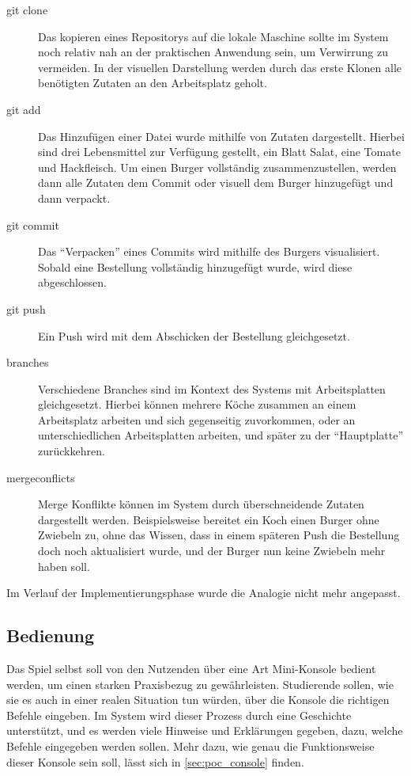 \begin{description}
    \item[git clone] Das kopieren eines Repositorys auf die lokale Maschine sollte im System noch relativ nah an der praktischen Anwendung sein, um Verwirrung zu vermeiden. In der visuellen Darstellung werden durch das erste Klonen alle benötigten Zutaten an den Arbeitsplatz geholt.
    \item[git add] Das Hinzufügen einer Datei wurde mithilfe von Zutaten dargestellt. Hierbei sind drei Lebensmittel zur Verfügung gestellt, ein Blatt Salat, eine Tomate und Hackfleisch. Um einen Burger vollständig zusammenzustellen, werden dann alle Zutaten dem Commit oder visuell dem Burger hinzugefügt und dann verpackt.
    \item[git commit] Das ``Verpacken'' eines Commits wird mithilfe des Burgers visualisiert. Sobald eine Bestellung vollständig hinzugefügt wurde, wird diese abgeschlossen.
    \item[git push] Ein Push wird mit dem Abschicken der Bestellung gleichgesetzt.
    \item[\gls{branches}] Verschiedene Branches sind im Kontext des Systems mit Arbeitsplatten gleichgesetzt. Hierbei können mehrere Köche zusammen an einem Arbeitsplatz arbeiten und sich gegenseitig zuvorkommen, oder an unterschiedlichen Arbeitsplatten arbeiten, und später zu der ``Hauptplatte'' zurückkehren.
    \item[\gls{mergeconflicts}] Merge Konflikte können im System durch überschneidende Zutaten dargestellt werden. Beispielsweise bereitet ein Koch einen Burger ohne Zwiebeln zu, ohne das Wissen, dass in einem späteren Push die Bestellung doch noch aktualisiert wurde, und der Burger nun keine Zwiebeln mehr haben soll.
\end{description}

Im Verlauf der Implementierungsphase wurde die Analogie nicht mehr angepasst.

\subsection{Bedienung}
Das Spiel selbst soll von den Nutzenden über eine Art Mini-Konsole bedient werden, um einen starken Praxisbezug zu gewährleisten.
Studierende sollen, wie sie es auch in einer realen Situation tun würden, über die Konsole die richtigen Befehle eingeben.
Im System wird dieser Prozess durch eine Geschichte unterstützt, und es werden viele Hinweise und Erklärungen gegeben, dazu, welche Befehle eingegeben werden sollen. Mehr dazu, wie genau die Funktionsweise dieser Konsole sein soll, lässt sich in \cref{sec:poc_console} finden.

